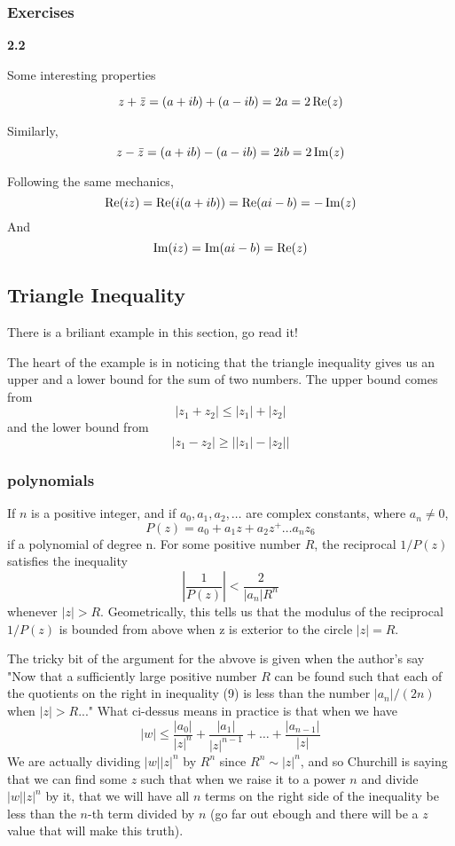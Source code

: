 \subsubsection{Exercises}

\textbf{2.2}

Some interesting properties

$$
z + \bar{z} = (a+ib) + (a-ib) = 2a = 2\operatorname{Re} (z)
$$

Similarly,
$$
z - \bar{z} = (a+ib) - (a-ib) = 2ib = 2\operatorname{Im} (z)
$$

Following the same mechanics,
$$
\operatorname{Re} (iz) = \operatorname{Re} (i(a+ib)) = \operatorname{Re} (ai-b) = -\operatorname{Im} (z)
$$
And
$$
\operatorname{Im} (iz) = \operatorname{Im} (ai -b) = \operatorname{Re} (z)
$$


\subsection{Triangle Inequality}

There is a briliant example in this section, go read it!

The heart of the example is in noticing that the triangle inequality gives us an upper and a lower
bound for the sum of two numbers.
The upper bound comes from
$$
|z_1 + z_2| \leq |z_1| + |z_2|
$$
and the lower bound from
$$
|z_1 - z_2| \geq \left| |z_1| - |z_2| \right|
$$

\subsubsection{polynomials}

If $n$ is a positive integer, and if $a_0, a_1, a_2, \ldots$ are complex constants,
where $a_n \neq 0$,
$$
P(z) = a_0 + a_1 z + a_2 z^ + \ldots a_n z_6
$$
if a polynomial of degree n.
For some positive number $R$, the reciprocal $1/P(z)$ satisfies the inequality
$$
\left| \frac{1}{P(z)} \right| < \frac{2}{|a_n| R^n}
$$
whenever $|z| > R$.
Geometrically, this tells us that the modulus of the reciprocal $1/P(z)$
is bounded from above when z is exterior to the circle $|z| = R$.

The tricky bit of the argument for the abvove is given when the author's say
"Now that a sufficiently large positive number $R$ can be found such that each of the
quotients on the right in inequality (9) is less than the number $|a_n |/(2n)$ when
$|z| > R$..."
What ci-dessus means in practice is that when we have
$$
|w| \leq \frac{|a_0|}{|z|^n} + \frac{|a_1|}{|z|^{n-1}} + \ldots + \frac{|a_{n-1}|}{|z|}
$$
We are actually dividing $|w||z|^n$ by $R^n$ since $R^n \sim |z|^n$, and so Churchill
is saying that we can find some $z$ such that when we raise it to a power $n$ and divide $|w||z|^n$
by it, that we will have all $n$ terms on the right side of the inequality be less than the $n$-th
term divided by $n$ (go far out ebough and there will be a $z$ value that will make this truth).

